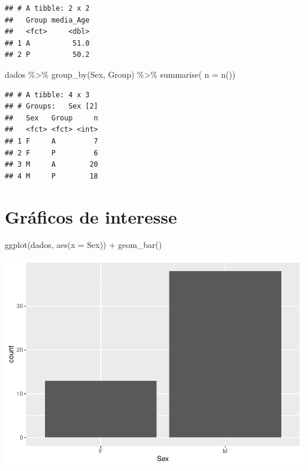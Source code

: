 \documentclass[
]{article}
\newenvironment{Shaded}{\begin{snugshade}}{\end{snugshade}}
\newcommand{\AttributeTok}[1]{\textcolor[rgb]{0.80,0.80,0.80}{#1}}
\newcommand{\FunctionTok}[1]{\textcolor[rgb]{0.94,0.94,0.56}{#1}}
\newcommand{\NormalTok}[1]{\textcolor[rgb]{0.80,0.80,0.80}{#1}}
\newcommand{\SpecialCharTok}[1]{\textcolor[rgb]{0.86,0.64,0.64}{#1}}
\begin{document}
\begin{verbatim}
## # A tibble: 2 x 2
##   Group media_Age
##   <fct>     <dbl>
## 1 A          51.0
## 2 P          50.2
\end{verbatim}

\begin{Shaded}
\begin{Highlighting}[]
\NormalTok{dados }\SpecialCharTok{\%\textgreater{}\%} 
  \FunctionTok{group\_by}\NormalTok{(Sex, Group) }\SpecialCharTok{\%\textgreater{}\%} 
  \FunctionTok{summarise}\NormalTok{( }\AttributeTok{n =} \FunctionTok{n}\NormalTok{())}
\end{Highlighting}
\end{Shaded}

\begin{verbatim}
## # A tibble: 4 x 3
## # Groups:   Sex [2]
##   Sex   Group     n
##   <fct> <fct> <int>
## 1 F     A         7
## 2 F     P         6
## 3 M     A        20
## 4 M     P        18
\end{verbatim}

\hypertarget{gruxe1ficos-de-interesse}{%
\section{Gráficos de interesse}\label{gruxe1ficos-de-interesse}}

\begin{Shaded}
\begin{Highlighting}[]
\FunctionTok{ggplot}\NormalTok{(dados, }\FunctionTok{aes}\NormalTok{(}\AttributeTok{x =}\NormalTok{ Sex)) }\SpecialCharTok{+}
  \FunctionTok{geom\_bar}\NormalTok{()}
\end{Highlighting}
\end{Shaded}

\includegraphics{EDA__files/figure-latex/unnamed-chunk-3-1.pdf}
\end{document}
